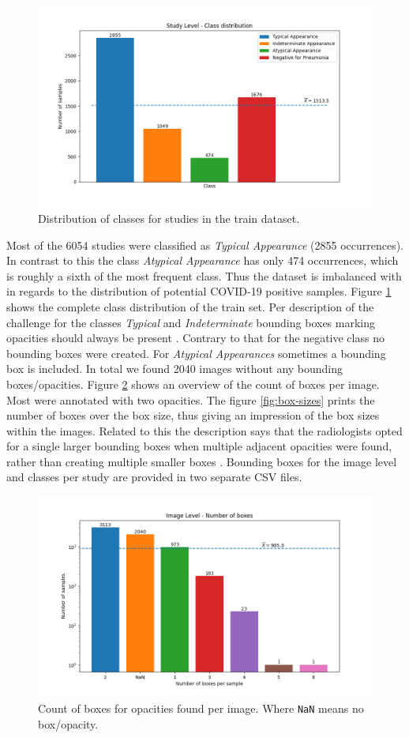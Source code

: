 \begin{figure}
	\centering
	\includegraphics[width=.75\linewidth]{img/class_distrinution_study.png}
	\caption{Distribution of classes for studies in the train dataset.}
	\label{fig:study-class-distribution}
\end{figure}

Most of the \num{6054} studies were classified as \textit{Typical Appearance} (\num{2855} occurrences). In contrast to this the class \textit{Atypical Appearance} has only \num{474} occurrences, which is roughly a sixth of the most frequent class. Thus the dataset is imbalanced with in regards to the distribution of potential COVID-19 positive samples. Figure \ref{fig:study-class-distribution} shows the complete class distribution of the train set. Per description of the challenge for the classes \textit{Typical} and \textit{Indeterminate} bounding boxes marking opacities should always be present \autocite{SIIMKaggleAnnotation}. Contrary to that for the negative class no bounding boxes were created. For \textit{Atypical Appearances} sometimes a bounding box is included. In total we found \num{2040} images without any bounding boxes/opacities. Figure \ref{fig:boxes-per-images} shows an overview of the count of boxes per image. Most were annotated with two opacities. The figure \ref{fig:box-sizes} prints the number of boxes over the box size, thus giving an impression of the box sizes within the images. Related to this the description says that the radiologists opted for a single larger bounding boxes when multiple adjacent opacities were found, rather than creating multiple smaller boxes \autocite{SIIMKaggleAnnotation}. Bounding boxes for the image level and classes per study are provided in two separate CSV files.

\begin{figure}
		\centering
		\includegraphics[width=.75\linewidth]{img/box_distribution_image.png}
		\caption{Count of boxes for opacities found per image. Where \texttt{NaN} means no box/opacity.}
		\label{fig:boxes-per-images}
\end{figure}

